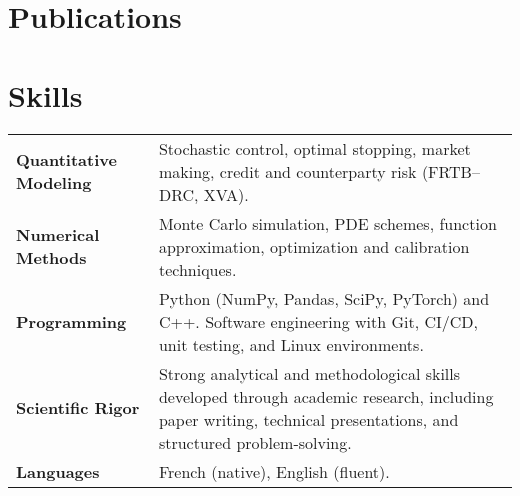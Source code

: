 \documentclass[a4paper,12pt]{article}
\begin{document}
	\section{Publications}
	\begin{refsection}
	\nocite{*}
	\printbibliography[heading=none]
	\end{refsection}

	\section{Skills}
	\begin{tabularx}{\linewidth}{@{}l X@{}}
		\textbf{Quantitative Modeling} & Stochastic control, optimal stopping, market making, credit and counterparty risk (FRTB–DRC, XVA). \\
		\textbf{Numerical Methods} & Monte Carlo simulation, PDE schemes, function approximation, optimization and calibration techniques. \\
		\textbf{Programming} & Python (NumPy, Pandas, SciPy, PyTorch) and C++. Software engineering with Git, CI/CD, unit testing, and Linux environments. \\
		\textbf{Scientific Rigor} & Strong analytical and methodological skills developed through academic research, including paper writing, technical presentations, and structured problem-solving. \\
		\textbf{Languages} & French (native), English (fluent). 
	\end{tabularx}
\end{document}
